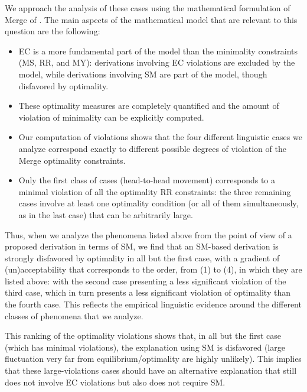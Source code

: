 \documentclass[12pt]{amsart}
\numberwithin{equation}{section}
\begin{document}
We approach the analysis of these cases using the mathematical formulation
of Merge of \cite{MCB}. The main aspects of the mathematical model that are
relevant to this question are the following:
\begin{itemize}
\item EC is a more fundamental part of the model than the minimality constraints
(MS, RR, and MY): derivations involving EC violations are excluded by the model, while
derivations involving SM are part of the model, though disfavored by optimality.
\item These optimality measures are completely quantified and the amount of violation 
of minimality can be explicitly computed.
\item Our computation of violations shows that the four different linguistic cases 
we analyze correspond  exactly to different possible degrees of violation of the Merge 
optimality constraints.
\item Only the first class of cases (head-to-head movement) corresponds to
a minimal violation of all the optimality RR constraints: the three remaining cases
involve at least one optimality condition (or all of them simultaneously, as in the last case) that 
can be arbitrarily large.
\end{itemize}

\smallskip

Thus, when we analyze the phenomena listed above from the
point of view of a proposed derivation in terms of SM, we
find that an SM-based derivation is strongly disfavored by
optimality in all but the first case, with a gradient of
(un)acceptability that corresponds to the order, from (1) to (4), in which
they are listed above: with the second case presenting 
a less significant violation of the third case, which in turn
presents a less significant violation of optimality than the
fourth case. This reflects the empirical linguistic evidence
around the different classes of phenomena that we analyze. 

\smallskip

This ranking of the optimality violations shows that,
in all but the first case (which has minimal violations),
the explanation using SM is disfavored (large fluctuation
very far from equilibrium/optimality are highly unlikely).
This implies that these large-violations cases should
have an alternative explanation that still does not involve
EC violations but also does not require SM. 

\smallskip
\end{document}
